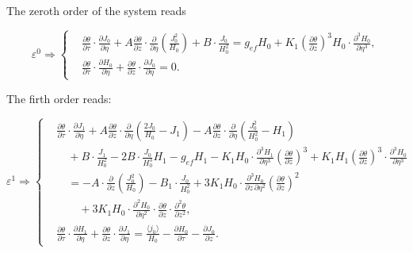 The zeroth order of the system reads


\begin{equation}
\varepsilon^0 \Rightarrow 
\left\{
\begin{aligned}
&\frac{\partial \theta}{\partial \tau} \cdot \frac{\partial J_0}{\partial \eta}
+ A \frac{\partial \theta}{\partial z} \cdot \frac{\partial}{\partial \eta} \left( \frac{J_0^2}{H_0} \right)
+ B \cdot \frac{J_0}{H_0^2}
= g_{\mathit{ef}} H_0 + K_1 \left( \frac{\partial \theta}{\partial z} \right)^3 H_0 \cdot \frac{\partial^3 H_0}{\partial \eta^3},
\\[1ex]
&\frac{\partial \theta}{\partial \tau} \cdot \frac{\partial H_0}{\partial \eta}
+ \frac{\partial \theta}{\partial z} \cdot \frac{\partial J_0}{\partial \eta}
= 0.
\end{aligned}
\right.
\end{equation}

The firth order reads:

\begin{equation}
\varepsilon^1 \Rightarrow
\left\{
\begin{aligned}
&\frac{\partial \theta}{\partial \tau} \cdot \frac{\partial J_1}{\partial \eta}
+ A \frac{\partial \theta}{\partial z} \cdot \frac{\partial}{\partial \eta} \left( \frac{2J_0}{H_0} - J_1 \right)
- A \frac{\partial \theta}{\partial z} \cdot \frac{\partial}{\partial \eta} \left( \frac{J_0^2}{H_0^2} - H_1 \right) \\
&\quad + B \cdot \frac{J_1}{H_0^2}
- 2B \cdot \frac{J_0}{H_0^3} H_1
- g_{\mathit{ef}} H_1
- K_1 H_0 \cdot \frac{\partial^3 H_1}{\partial \eta^3} \left( \frac{\partial \theta}{\partial z} \right)^3
+ K_1 H_1 \left( \frac{\partial \theta}{\partial z} \right)^3 \cdot \frac{\partial^3 H_0}{\partial \eta^3} \\
&\quad = - A \cdot \frac{\partial}{\partial z} \left( \frac{J_0^2}{H_0} \right)
- B_1 \cdot \frac{J_0}{H_0^2}
+ 3K_1 H_0 \cdot \frac{\partial^3 H_0}{\partial z\, \partial \eta^2} \left( \frac{\partial \theta}{\partial z} \right)^2 \\
&\qquad + 3K_1 H_0 \cdot \frac{\partial^2 H_0}{\partial \eta^2} \cdot \frac{\partial \theta}{\partial z} \cdot \frac{\partial^2 \theta}{\partial z^2}, \\[1.5ex]
&\frac{\partial \theta}{\partial \tau} \cdot \frac{\partial H_1}{\partial \eta}
+ \frac{\partial \theta}{\partial z} \cdot \frac{\partial J_1}{\partial \eta}
= \frac{\langle j_0 \rangle}{H_0}
- \frac{\partial H_0}{\partial \tau}
- \frac{\partial J_0}{\partial z}.
\end{aligned}
\right.
\end{equation}

